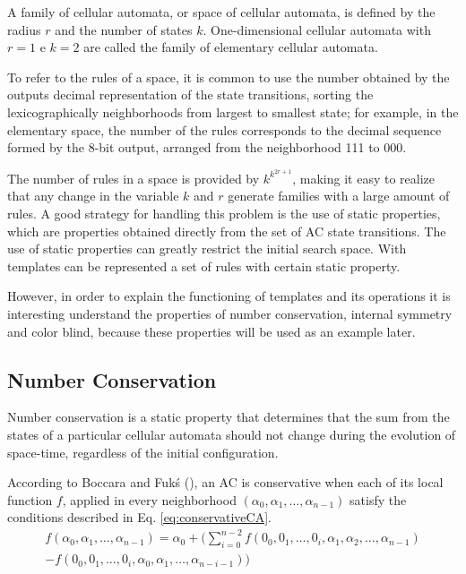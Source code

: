 \documentclass[12pt, a4paper]{article}
\begin{document}
A family of cellular automata, or space of cellular automata, is defined by the radius $r$ and the number of states $k$. One-dimensional cellular automata with $r=1$ e $k=2$ are called the family of elementary cellular automata.

To refer to the rules of a space, it is common to use the number obtained by the outputs decimal representation  of the state transitions, sorting the lexicographically neighborhoods from largest to smallest state; for example, in the elementary space, the number of the rules corresponds to the decimal sequence formed by the 8-bit output, arranged from the neighborhood 111 to 000.%

The number of rules in a space is provided by $k^{k^{2r+1}}$, making it easy to realize that any change in the variable $k$ and $r$ generate families with a large amount of rules. A good strategy for handling this problem is the use of static properties, which are properties obtained directly from the set of AC state transitions. The use of static properties can greatly restrict the initial search space. With templates can be represented a set of rules with certain static property.

However, in order to explain the functioning of templates and its operations it is interesting understand the properties of number conservation, internal symmetry and color blind, because these properties will be used as an example later.

\subsection{Number Conservation}
Number conservation is a static property that determines that the sum from the states of a particular cellular automata should not change during the evolution of space-time, regardless of the initial configuration.

According to Boccara and Fukś (\citeyear{boccara2002}), an AC is conservative when each of its local function $f$, applied in every neighborhood $(\alpha_0,\alpha_1, \dots, \alpha_{n-1})$ satisfy the conditions described in Eq. \eqref{eq:conservativeCA}.
\begin{equation}
\begin{split}
f(\alpha_0,\alpha_1, \dots,\alpha_{n-1}) = \alpha_0 + (\sum_{i=0}^{n-2}f(0_0,0_1, \dots,0_i,\alpha_1,\alpha_2, \dots,\alpha_{n-1}) \\- f(0_0,0_1, \dots,0_i,\alpha_0,\alpha_1, \dots,\alpha_{n-i-1}))
\label{eq:conservativeCA}
\end{split}
\end{equation}
\end{document}
